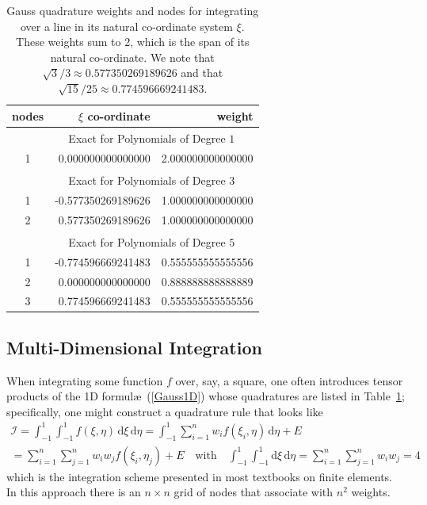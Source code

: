 \begin{table}
    \centering
    \begin{tabular}{|c|rr|}
        \hline
        nodes & \centering $\xi$ co-ordinate \phantom{123}  & 
        weight \phantom{123456} \\ \hline
        & \multicolumn{2}{|c|}{Exact for Polynomials of Degree $1^{\phantom{|^|}}$} \\ 
        \hline
        1 & 0.000000000000000 & 2.000000000000000 \\ 
        \hline
        & \multicolumn{2}{|c|}{Exact for Polynomials of Degree $3^{\phantom{|^|}}$} \\ \hline
        1 & -0.577350269189626 & 1.000000000000000 \\
        2 & 0.577350269189626 & 1.000000000000000 \\ 
        \hline
        & \multicolumn{2}{|c|}{Exact for Polynomials of Degree $5^{\phantom{|^|}}$} \\ \hline
        1 & -0.774596669241483 & 0.555555555555556 \\
        2 & 0.000000000000000 & 0.888888888888889 \\
        3 & 0.774596669241483 & 0.555555555555556 \\ 
        \hline
    \end{tabular}
    \caption{Gauss quadrature weights and nodes for integrating over a line in its natural co-ordinate system $\xi$.  These weights sum to 2, which is the span of its natural co-ordinate.  We note that $\sqrt{3} / 3 \approx 0.577350269189626$ and that $\sqrt{15} / 25 \approx 0.774596669241483$.}
    \label{tabQuadrature1D}
\end{table}


\subsection{Multi-Dimensional Integration}

When integrating some function $f$ over, say, a square, one often introduces tensor products of the 1D formul\ae\ (\ref{Gauss1D}) whose quadratures are listed in Table~\ref{tabQuadrature1D}; specifically, one might construct a quadrature rule that looks like
\begin{multline*}
    \mathcal{I} = \int_{-1}^1 \int_{-1}^1 f ( \xi , \eta ) \, \mathrm{d} \xi \, \mathrm{d} \eta =
    \int_{-1}^1 \sum_{i=1}^n w_i f ( \xi_i , \eta ) \, \mathrm{d} \eta + E \\ =
    \sum_{i=1}^n \sum_{j=1}^n w_i w_j f ( \xi_i , \eta_ j ) + E  
    \quad \text{with} \quad
    \int_{-1}^1 \int_{-1}^1 \mathrm{d} \xi \, \mathrm{d} \eta = 
    \sum_{i=1}^n \sum_{j=1}^n w_i w_j = 4
\end{multline*}
which is the integration scheme presented in most textbooks on finite elements.  In this approach there is an $n \times n$ grid of nodes that associate with $n^2$ weights.  

